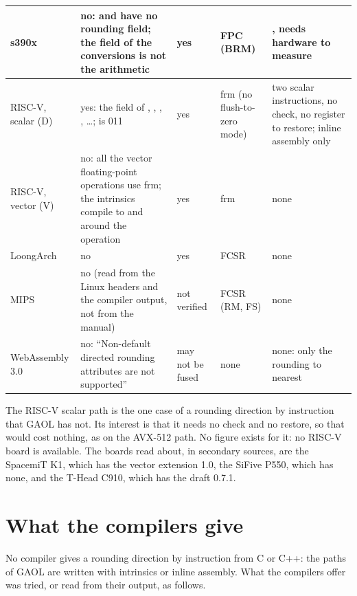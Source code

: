 \documentclass[12pt,a4paper,twoside,openright]{book}
\begin{document}
\begin{longtable}{|L{2.0cm}|L{3.8cm}|L{2.1cm}|L{2.0cm}|L{2.9cm}|}
\hline
s390x & no:  and  have no rounding field; the 
field of the conversions is not the arithmetic & yes & FPC (BRM) &
, needs hardware to measure \\
\hline
RISC-V, scalar (D) & yes: the  field of ,
, , , \ldots;
 is 011 & yes & frm (no flush-to-zero mode) & two scalar
instructions, no check, no register to restore; inline assembly only \\
\hline
RISC-V, vector (V) & no: all the vector floating-point operations use frm;
the  intrinsics compile to  and  around
the operation & yes & frm & none \\
\hline
LoongArch & no & yes & FCSR & none \\
\hline
MIPS & no (read from the Linux headers and the compiler output, not from the
manual) & not verified & FCSR (RM, FS) & none \\
\hline
WebAssembly 3.0 & no: ``Non-default directed rounding attributes are not
supported'' &  may not be fused & none & none: only the
rounding to nearest \\
\hline
\end{longtable}
\endgroup

The RISC-V scalar path is the one case of a rounding direction by
instruction that GAOL has not. Its interest is that it needs no check and no
restore, so that  would cost nothing, as on
the AVX-512 path. No figure exists for it: no RISC-V board is available. The
boards read about, in secondary sources, are the SpacemiT K1, which has the
vector extension 1.0, the SiFive P550, which has none, and the T-Head C910,
which has the draft 0.7.1.

\section{What the compilers give}
\label{sec:compilers-give}
%
%

No compiler gives a rounding direction by instruction from C or C++: the
paths of GAOL are written with intrinsics or inline assembly. What the
compilers offer was tried, or read from their output, as follows.
\end{document}
